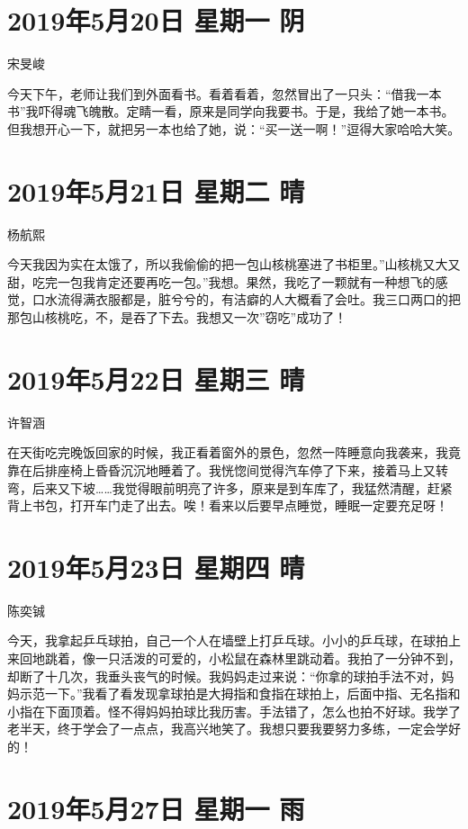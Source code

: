 \section{2019年5月20日 星期一 阴}

宋旻峻

今天下午，老师让我们到外面看书。看着看着，忽然冒出了一只头：``借我一本书''我吓得魂飞魄散。定睛一看，原来是同学向我要书。于是，我给了她一本书。但我想开心一下，就把另一本也给了她，说：``买一送一啊！''逗得大家哈哈大笑。

\section{2019年5月21日 星期二 晴}

杨航熙

今天我因为实在太饿了，所以我偷偷的把一包山核桃塞进了书柜里。''山核桃又大又甜，吃完一包我肯定还要再吃一包。''我想。果然，我吃了一颗就有一种想飞的感觉，口水流得满衣服都是，脏兮兮的，有洁癖的人大概看了会吐。我三口两口的把那包山核桃吃，不，是吞了下去。我想又一次''窃吃''成功了！

\section{2019年5月22日 星期三 晴}

许智涵

在天街吃完晚饭回家的时候，我正看着窗外的景色，忽然一阵睡意向我袭来，我竟靠在后排座椅上昏昏沉沉地睡着了。我恍惚间觉得汽车停了下来，接着马上又转弯，后来又下坡\ldots{}\ldots{}我觉得眼前明亮了许多，原来是到车库了，我猛然清醒，赶紧背上书包，打开车门走了出去。唉！看来以后要早点睡觉，睡眠一定要充足呀！

\section{2019年5月23日 星期四 晴}

陈奕铖

今天，我拿起乒乓球拍，自己一个人在墙壁上打乒乓球。小小的乒乓球，在球拍上来回地跳着，像一只活泼的可爱的，小松鼠在森林里跳动着。我拍了一分钟不到，却断了十几次，我垂头丧气的时候。我妈妈走过来说：``你拿的球拍手法不对，妈妈示范一下。''我看了看发现拿球拍是大拇指和食指在球拍上，后面中指、无名指和小指在下面顶着。怪不得妈妈拍球比我历害。手法错了，怎么也拍不好球。我学了老半天，终于学会了一点点，我高兴地笑了。我想只要我要努力多练，一定会学好的！

\section{2019年5月27日 星期一 雨}

